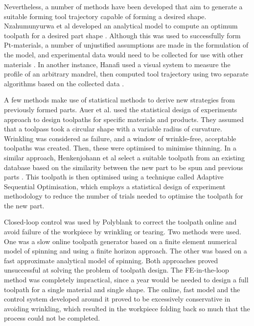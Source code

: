
Nevertheless, a number of methods have been developed that aim to generate a suitable forming tool trajectory capable of forming a desired shape. Nzahumunyurwa et al developed an analytical model to compute an optimum toolpath for a desired part shape \citep{Nzahumunyurwa2001OptimizationProcess}. Although this was used to successfully form Pt-materials, a number of unjustified assumptions are made in the formulation of the model, and experimental data would need to be collected for use with other materials \citep{Iacopo2020CraftsmanshipSpinning}. In another instance, Hanafi used a visual system to measure the profile of an arbitrary mandrel, then computed tool trajectory using two separate algorithms based on the collected data \citep{Hanafi2003VisualSpinning}.

A few methods make use of statistical methods to derive new strategies from previously formed parts. Auer et al. \citep{Auer2004ComparisonSpinning} used the statistical design of experiments approach to design toolpaths for specific materials and products. They assumed that a toolpass took a circular shape with a variable radius of curvature. Wrinkling was considered as failure, and a window of wrinkle-free, acceptable toolpaths was created. Then, these were optimised to minimise thinning. In a similar approach, Henkenjohann et al select a suitable toolpath from an existing database based on the similarity between the new part to be spun and previous parts \citep{Henkenjohann2005AnProcess}. This toolpath is then optimised using a technique called Adaptive Sequential Optimisation, which employs a statistical design of experiment methodology to reduce the number of trials needed to optimise the toolpath for the new part.


Closed-loop control was used by Polyblank  \citep{Polyblank2015TheSpinning} to correct the toolpath online and avoid failure of the workpiece by wrinkling or tearing. Two methods were used. One was a slow online toolpath generator based on a finite element numerical model of spinning and using a finite horizon approach. The other was based on a fast approximate analytical model of spinning. Both approaches proved unsuccessful at solving the problem of toolpath design.  The FE-in-the-loop method was completely impractical, since a year would be needed to design a full toolpath for a single material and single shape. The online, fast model and the control system developed around it proved to be excessively conservative in avoiding wrinkling, which resulted in the workpiece folding back so much that the process could not be completed.  

